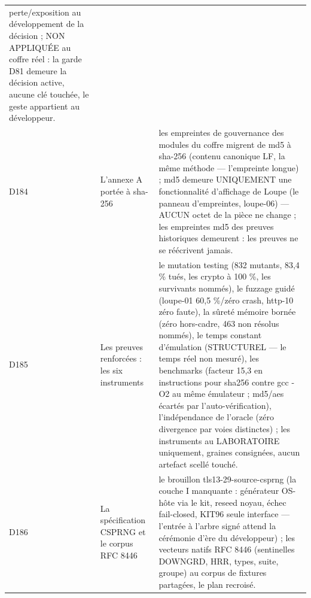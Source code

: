 \begin{longtable}{@{}p{1.6cm} p{4.6cm} >{\raggedright\arraybackslash}p{9.5cm}@{}}
perte/exposition au développement de la décision ; NON APPLIQUÉE au coffre
réel : la garde D81 demeure la décision active, aucune clé touchée, le
geste appartient au développeur. \\
D184 & L'annexe A portée à sha-256 & les empreintes de gouvernance des
modules du coffre migrent de md5 à sha-256 (contenu canonique LF, la même
méthode — l'empreinte longue) ; md5 demeure UNIQUEMENT une fonctionnalité
d'affichage de Loupe (le panneau d'empreintes, loupe-06) — AUCUN octet de
la pièce ne change ; les empreintes md5 des preuves historiques demeurent
: les preuves ne se réécrivent jamais. \\
D185 & Les preuves renforcées : les six instruments & le mutation
testing (832 mutants, 83,4 \% tués, les crypto à 100 \%, les survivants
nommés), le fuzzage guidé (loupe-01 60,5 \%/zéro crash, http-10 zéro
faute), la sûreté mémoire bornée (zéro hors-cadre, 463 non résolus
nommés), le temps constant d'émulation (STRUCTUREL — le temps réel non
mesuré), les benchmarks (facteur 15,3 en instructions pour sha256 contre
gcc -O2 au même émulateur ; md5/aes écartés par l'auto-vérification),
l'indépendance de l'oracle (zéro divergence par voies distinctes) ; les
instruments au LABORATOIRE uniquement, graines consignées, aucun
artefact scellé touché. \\
D186 & La spécification CSPRNG et le corpus RFC 8446 & le brouillon
tls13-29-source-csprng (la couche I manquante : générateur OS-hôte via
le kit, reseed noyau, échec fail-closed, KIT96 seule interface —
l'entrée à l'arbre signé attend la cérémonie d'ère du développeur) ; les
vecteurs natifs RFC 8446 (sentinelles DOWNGRD, HRR, types, suite,
groupe) au corpus de fixtures partagées, le plan recroisé. \\
\end{longtable}